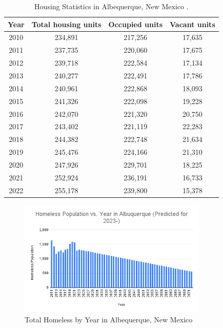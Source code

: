 \documentclass[12pt]{article}
\begin{document}
\begin{table}[H]
  \centering
  \begin{tabular}{|c c c c|} 
    \hline 
    Year & Total housing units & Occupied units & Vacant units \\ [0.5ex]
    \hline
    2010 & 234,891 & 217,256 & 17,635 \\
    2011 & 237,735 & 220,060 & 17,675 \\
    2012 & 239,718 & 222,584 & 17,134 \\
    2013 & 240,277 & 222,491 & 17,786 \\
    2014 & 240,961 & 222,868 & 18,093 \\
    2015 & 241,326 & 222,098 & 19,228 \\
    2016 & 242,070 & 221,320 & 20,750 \\
    2017 & 243,402 & 221,119 & 22,283 \\
    2018 & 244,382 & 222,748 & 21,634 \\
    2019 & 245,476 & 224,166 & 21,310 \\
    2020 & 247,926 & 229,701 & 18,225 \\
    2021 & 252,924 & 236,191 & 16,733 \\
    2022 & 255,178 & 239,800 & 15,378 \\ [1ex] 
    \hline
  \end{tabular}
  \caption{Housing Statistics in Albequerque, New Mexico \cite{Census2010ACSDP1Y2010.DP04}.}
\end{table}

\begin{figure}[H]
  \centering
  \includegraphics[width=0.8\textwidth]{homeless-vs-year-alb}
  \caption{Total Homeless by Year in Albequerque, New Mexico}
\end{figure}
\end{document}
